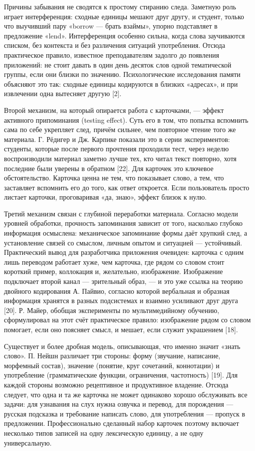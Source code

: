 \documentclass[11pt,a4paper,openany]{report}
\begin{document}
Причины забывания не сводятся к простому стиранию следа. Заметную роль играет интерференция: сходные единицы мешают друг другу, и студент, только что выучивший пару «borrow — брать взаймы», упорно подставляет в предложение «lend». Интерференция особенно сильна, когда слова заучиваются списком, без контекста и без различения ситуаций употребления. Отсюда практическое правило, известное преподавателям задолго до появления приложений: не стоит давать в один день десяток слов одной тематической группы, если они близки по значению. Психологические исследования памяти объясняют это так: сходные единицы кодируются в близких «адресах», и при извлечении одна вытесняет другую [2].

Второй механизм, на который опирается работа с карточками, — эффект активного припоминания (testing effect). Суть его в том, что попытка вспомнить сама по себе укрепляет след, причём сильнее, чем повторное чтение того же материала. Г. Рёдигер и Дж. Карпике показали это в серии экспериментов: студенты, которые после первого прочтения проходили тест, через неделю воспроизводили материал заметно лучше тех, кто читал текст повторно, хотя последние были уверены в обратном [22]. Для карточек это ключевое обстоятельство. Карточка ценна не тем, что показывает слово, а тем, что заставляет вспомнить его до того, как ответ откроется. Если пользователь просто листает карточки, проговаривая «да, знаю», эффект близок к нулю.

Третий механизм связан с глубиной переработки материала. Согласно модели уровней обработки, прочность запоминания зависит от того, насколько глубоко информация осмыслена: механическое запоминание формы даёт хрупкий след, а установление связей со смыслом, личным опытом и ситуацией — устойчивый. Практический вывод для разработчика приложения очевиден: карточка с одним лишь переводом работает хуже, чем карточка, где рядом со словом стоит короткий пример, коллокация и, желательно, изображение. Изображение подключает второй канал — зрительный образ, — и это уже ссылка на теорию двойного кодирования А. Пайвио, согласно которой вербальная и образная информация хранятся в разных подсистемах и взаимно усиливают друг друга [20]. Р. Майер, обобщая эксперименты по мультимедийному обучению, сформулировал на этот счёт практическое правило: изображение рядом со словом помогает, если оно поясняет смысл, и мешает, если служит украшением [18].

Существует и более дробная модель, описывающая, что именно значит «знать слово». П. Нейшн различает три стороны: форму (звучание, написание, морфемный состав), значение (понятие, круг сочетаний, коннотации) и употребление (грамматические функции, ограничения, частотность) [19]. Для каждой стороны возможно рецептивное и продуктивное владение. Отсюда следует, что одна и та же карточка не может одинаково хорошо обслуживать все задачи: для узнавания на слух нужна озвучка и перевод, для порождения — русская подсказка и требование написать слово, для употребления — пропуск в предложении. Профессионально сделанный набор карточек поэтому включает несколько типов записей на одну лексическую единицу, а не одну универсальную.
\end{document}
